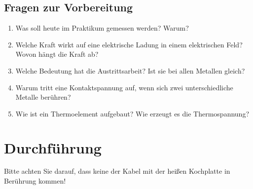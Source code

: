 \begin{tutorhint}
\section{Fragen zur Vorbereitung}

\begin{enumerate}
 \item Was soll heute im Praktikum gemessen werden? Warum?
 \item Welche Kraft wirkt auf eine elektrische Ladung in einem elektrischen Feld? Wovon hängt die Kraft ab?
 \item Welche Bedeutung hat die Austrittsarbeit? Ist sie bei allen Metallen gleich?
 \item Warum tritt eine Kontaktspannung auf, wenn sich zwei unterschiedliche Metalle berühren?
 \item Wie ist ein Thermoelement aufgebaut? Wie erzeugt es die Thermospannung?
\end{enumerate}
\end{tutorhint}

\section{Durchführung} 

\begin{hint}
Bitte achten Sie darauf, dass keine der Kabel mit der heißen Kochplatte in Berührung kommen!
\end{hint}


